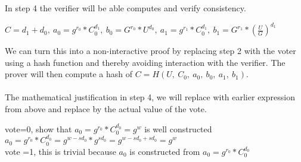 \noindent
In step 4 the verifier will be able computes and verify consistency.

\noindent
\begin{infobox}[Step 4]
\begin{math}C = d_1 + d_0,\ a_0=g^{r_0} * C^{d_1}_0,\ b_0 = G^{r_0}*U^{d_0},\ a_1=g^{r_1} * C^{d_1}_0,\ b_1= G^{r_1} *(\frac{U}{G})^{d_1}\end{math}
\end{infobox}

 We can turn this into a non-interactive proof by replacing step 2 with the voter using a hash function and thereby avoiding interaction with the verifier. The prover will then compute a hash of \begin{math}C=H(U,\ C_0,\ a_0,\ b_0,\ a_1,\ b_1) \end{math}.\\\\

 The mathematical justification in step 4, we will replace with earlier expression from above and replace by the actual value of the vote.

\begin{infobox}[Explanation of \begin{math}a_0=g^{r_0} * C^{d_1}_0\end{math}]
vote=0, show that \begin{math}a_0=g^{r_0} * C^{d_0}_0 = g^w \end{math} is well constructed\\
\begin{math}a_0=g^{r_0} * C^{d_0}_0 = g^{w-sd_0}* g^{sd_0}= g^{w-sd_0+ sd_0}= g^w\end{math}\\
vote =1, this is trivial because \begin{math}a_0 \end{math}  is constructed from \begin{math}a_0=g^{r_0} * C^{d_0}_0 \end{math}
\end{infobox}


